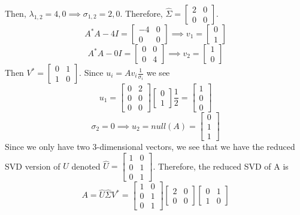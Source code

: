 \documentclass[12pt]{article}
\numberwithin{equation}{section}
\begin{document}
\begin{enumerate}
\begin{enumerate}
    Then, $\lambda_{1,2}=4,0\implies\sigma_{1,2}=2,0$. Therefore, $\hat{\Sigma}=\left[\begin{array}{cc}2&0\\0&0\end{array}\right]$.
    $$A^*A-4I=\left[\begin{array}{cc}-4&0\\0&0\end{array}\right]\implies v_1=\left[\begin{array}{c}0\\1\end{array}\right]$$
    $$A^*A-0I=\left[\begin{array}{cc}0&0\\0&4\end{array}\right]\implies v_2=\left[\begin{array}{c}1\\0\end{array}\right]$$
    Then $V^*=\left[\begin{array}{cc}0&1\\1&0\end{array}\right]$. Since $u_i=Av_i\frac{1}{\sigma_i}$ we see
    $$u_1=\left[\begin{array}{cc}0&2\\0&0\\0&0\end{array}\right]\left[\begin{array}{c}0\\1\end{array}\right]\frac{1}{2}=\left[\begin{array}{c}1\\0\\0\end{array}\right]$$
    $$\sigma_2=0\implies u_2=null(A)=\left[\begin{array}{c}0\\1\\1\end{array}\right]$$
    Since we only have two 3-dimensional vectors, we see that we have the reduced SVD version of $U$ denoted $\hat{U}=\left[\begin{array}{cc}1&0\\0&1\\0&1\end{array}\right]$. Therefore, the reduced SVD of A is
    $$A=\hat{U}\hat{\Sigma}V^*=\left[\begin{array}{cc}1&0\\0&1\\0&1\end{array}\right]\left[\begin{array}{cc}2&0\\0&0\end{array}\right]\left[\begin{array}{cc}0&1\\1&0\end{array}\right]$$

\end{enumerate}
\end{enumerate}
\end{document}
